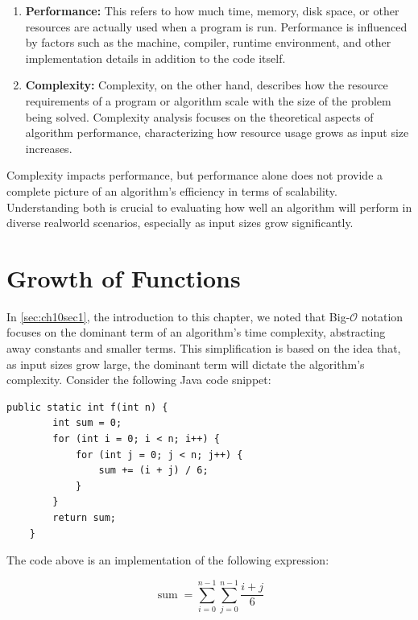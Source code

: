 \begin{enumerate}
    \item \textbf{Performance:} This refers to how much time, memory, disk space, or other resources are actually used when a program is run. Performance is influenced by factors such as the machine, compiler, runtime environment, and other implementation details in addition to the code itself.
    \item \textbf{Complexity:} Complexity, on the other hand, describes how the resource requirements of a program or algorithm scale with the size of the problem being solved. Complexity analysis focuses on the theoretical aspects of algorithm performance, characterizing how resource usage grows as input size increases.
\end{enumerate}

Complexity impacts performance, but performance alone does not provide a complete picture of an algorithm's efficiency in terms of scalability. Understanding both is crucial to evaluating how well an algorithm will perform in diverse realworld scenarios, especially as input sizes grow significantly.

\section{Growth of Functions}
In \autoref{sec:ch10sec1}, the introduction to this chapter, we noted that Big-$\mathcal{O}$ notation focuses on the dominant term of an algorithm's time complexity, abstracting away constants and smaller terms. This simplification is based on the idea that, as input sizes grow large, the dominant term will dictate the algorithm's complexity. Consider the following Java code snippet:

\newpage

\begin{lstlisting}[style=javaStyle, caption={Java SumCalculator}, label={lst:java_f_function}]
    public static int f(int n) {
        int sum = 0;
        for (int i = 0; i < n; i++) {
            for (int j = 0; j < n; j++) {
                sum += (i + j) / 6;
            }
        }
        return sum;
    }
\end{lstlisting}

The code above is an implementation of the following expression:

\[
\operatorname{sum}=\sum_{i=0}^{n-1} \sum_{j=0}^{n-1} \frac{i+j}{6}
\]

